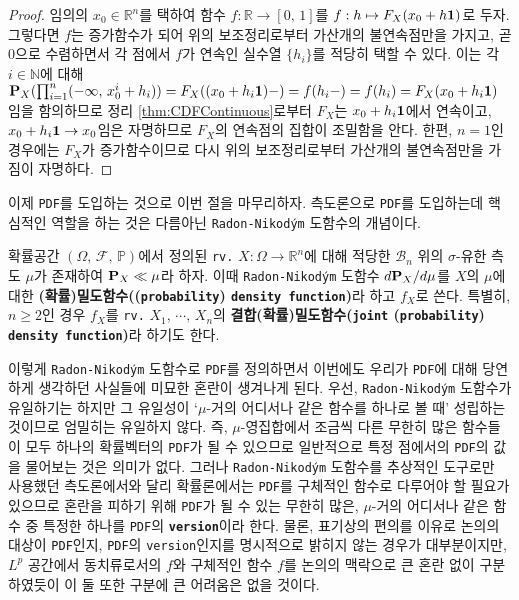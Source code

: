 \begin{proof}
    임의의 $x_0\in\mathbb{R}^n$를 택하여 함수 $f:\mathbb{R}\to[0,\,1]$를 $f:h\mapsto F_X(x_0+h\mathbf{1})$로 두자. 그렇다면 $f$는 증가함수가 되어 위의 보조정리로부터 가산개의 불연속점만을 가지고, 곧 $0$으로 수렴하면서 각 점에서 $f$가 연속인 실수열 $\{h_i\}$를 적당히 택할 수 있다. 이는 각 $i\in\mathbb{N}$에 대해 $\mathbf{P}_X(\prod_{i=1}^n(-\infty,\,x_0^i+h_i))=F_X((x_0+h_i\mathbf{1})-)=f(h_i-)=f(h_i)=F_X(x_0+h_i\mathbf{1})$임을 함의하므로 정리 \ref{thm:CDFContinuous}로부터 $F_X$는 $x_0+h_i\mathbf{1}$에서 연속이고, $x_0+h_i\mathbf{1}\to x_0$임은 자명하므로 $F_X$의 연속점의 집합이 조밀함을 안다. 한편, $n=1$인 경우에는 $F_X$가 증가함수이므로 다시 위의 보조정리로부터 가산개의 불연속점만을 가짐이 자명하다.
\end{proof}

이제 \texttt{PDF}를 도입하는 것으로 이번 절을 마무리하자. 측도론으로 \texttt{PDF}를 도입하는데 핵심적인 역할을 하는 것은 다름아닌 \texttt{Radon-Nikod\'ym} 도함수의 개념이다.

\begin{definition}
    확률공간 $(\Omega,\,\mathcal{F},\,\mathbb{P})$에서 정의된 \texttt{rv.} $X:\Omega\to\mathbb{R}^n$에 대해 적당한 $\mathcal{B}_n$ 위의 $\sigma$-유한 측도 $\mu$가 존재하여 $\mathbf{P}_X\ll\mu$라 하자. 이때 \texttt{Radon-Nikod\'ym} 도함수 $d\mathbf{P}_X/d\mu$를 $X$의 $\mu$에 대한 \textbf{(확률)밀도함수((\texttt{probability}) \texttt{density function})}라 하고 $f_X$로 쓴다. 특별히, $n\geq2$인 경우 $f_X$를 \texttt{rv.} $X_1,\,\cdots,\,X_n$의 \textbf{결합(확률)밀도함수(\texttt{joint} (\texttt{probability}) \texttt{density function})}라 하기도 한다.
\end{definition}

이렇게 \texttt{Radon-Nikod\'ym} 도함수로 \texttt{PDF}를 정의하면서 이번에도 우리가 \texttt{PDF}에 대해 당연하게 생각하던 사실들에 미묘한 혼란이 생겨나게 된다. 우선, \texttt{Radon-Nikod\'ym} 도함수가 유일하기는 하지만 그 유일성이 `$\mu$-거의 어디서나 같은 함수를 하나로 볼 때' 성립하는 것이므로 엄밀히는 유일하지 않다. 즉, $\mu$-영집합에서 조금씩 다른 무한히 많은 함수들이 모두 하나의 확률벡터의 \texttt{PDF}가 될 수 있으므로 일반적으로 특정 점에서의 \texttt{PDF}의 값을 물어보는 것은 의미가 없다. 그러나 \texttt{Radon-Nikod\'ym} 도함수를 추상적인 도구로만 사용했던 측도론에서와 달리 확률론에서는 \texttt{PDF}를 구체적인 함수로 다루어야 할 필요가 있으므로 혼란을 피하기 위해 \texttt{PDF}가 될 수 있는 무한히 많은, $\mu$-거의 어디서나 같은 함수 중 특정한 하나를 \texttt{PDF}의 \textbf{\texttt{version}}이라 한다. 물론, 표기상의 편의를 이유로 논의의 대상이 \texttt{PDF}인지, \texttt{PDF}의 \texttt{version}인지를 명시적으로 밝히지 않는 경우가 대부분이지만, $L^p$ 공간에서 동치류로서의 $f$와 구체적인 함수 $f$를 논의의 맥락으로 큰 혼란 없이 구분하였듯이 이 둘 또한 구분에 큰 어려움은 없을 것이다.

